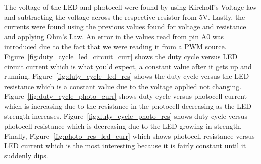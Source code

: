 \documentclass[12pt,titlepage]{article}
\begin{document}
The voltage of the LED and photocell were found by using Kirchoff's Voltage law and subtracting the voltage
across the respective resistor from 5V. Lastly, the currents were found using the previous values found for
voltage and resistance and applying Ohm's Law. An error in the values read from pin A0 was introduced due to
the fact that we were reading it from a PWM source. Figure~\ref{fig:duty_cycle_led_circuit_curr} shows the
duty cycle versus LED circuit current which is what you'd expect, a constant value after it gets up and
running. Figure~\ref{fig:duty_cycle_led_res} shows the duty cycle versus the LED resistance which is a
constant value due to the voltage applied not changing. Figure~\ref{fig:duty_cycle_photo_curr}
shows duty cycle versus photocell current which is increasing due to the resistance in the photocell
decreasing as the LED strength increases. Figure~\ref{fig:duty_cycle_photo_res} shows duty cycle versus
photocell resistance which is decreasing due to the LED growing in strength. Finally,
Figure~\ref{fig:photo_res_led_curr} which shows photocell resistance versus LED current which is the most
interesting because it is fairly constant until it suddenly dips.
\end{document}
